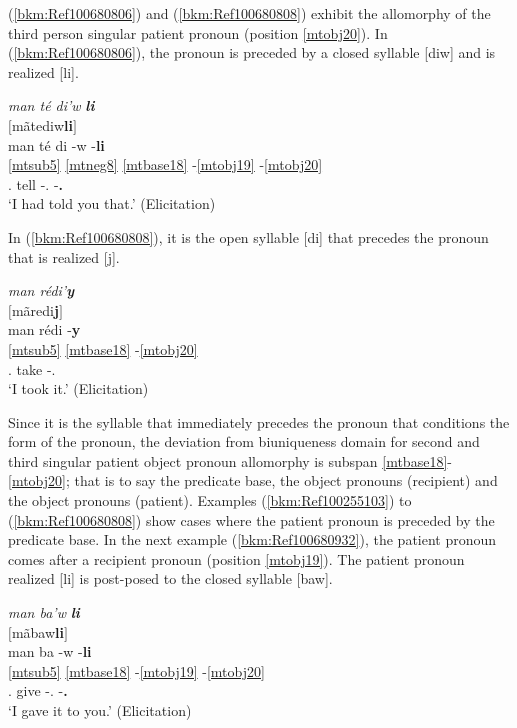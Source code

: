 \documentclass[output=paper]{langscibook}
\begin{document}
(\ref{bkm:Ref100680806}) and (\ref{bkm:Ref100680808}) exhibit the allomorphy of the third person singular patient pronoun (position \ref{mtobj20}). In (\ref{bkm:Ref100680806}), the pronoun is preceded by a closed syllable [diw] and is realized [li].


\ea\label{bkm:Ref100680806}
\textit{man té di’w} \textbf{\textit{li}}\\
$[$mãtediw\textbf{li}$]$\\
\glll man té di -w -\textbf{li}\\
\ref{mtsub5} \ref{mtneg8} \ref{mtbase18} -\ref{mtobj19} -\ref{mtobj20} \\
\First\Sg.\Sarg{} \Pst{} tell -\Second\Sg.\Obj{} -\textbf{\Third\Sg.\Obj{}}\\
\glt `I had told you that.' (Elicitation)
\z

In (\ref{bkm:Ref100680808}), it is the open syllable [di] that precedes the pronoun that is realized [j].

\ea\label{bkm:Ref100680808}
\textit{man rédi’}\textbf{\textit{y}}\\
$[$mãredi\textbf{j}$]$\\
\glll man rédi -\textbf{y}\\
\ref{mtsub5} \ref{mtbase18} -\ref{mtobj20} \\
\First\Sg.\Sarg{} take -\Third\Sg.\Obj{}\\
\glt `I took it.' (Elicitation)
\z

Since it is the syllable that immediately precedes the pronoun that conditions the form of the pronoun, the deviation from biuniqueness domain for second and third singular patient object pronoun allomorphy is subspan \ref{mtbase18}-\ref{mtobj20}; that is to say the predicate base, the object pronouns (recipient) and the object pronouns (patient). Examples (\ref{bkm:Ref100255103}) to (\ref{bkm:Ref100680808}) show cases where the patient pronoun is preceded by the predicate base. In the next example (\ref{bkm:Ref100680932}), the patient pronoun comes after a recipient pronoun (position \ref{mtobj19}). The patient pronoun realized [li] is post-posed to the closed syllable [baw].

\newpage
\ea\label{bkm:Ref100680932}
\textit{man ba’w} \textbf{\textit{li}}\\
$[$mãbaw\textbf{li}$]$\\
\glll man ba -w -\textbf{li}\\ 
\ref{mtsub5} \ref{mtbase18} -\ref{mtobj19} -\ref{mtobj20} \\ 
\First\Sg.\Sarg{} give -\Second\Sg.\Obj{} -\textbf{\Third\Sg.\Obj{}}\\
\glt `I gave it to you.' (Elicitation)
\z
\end{document}
